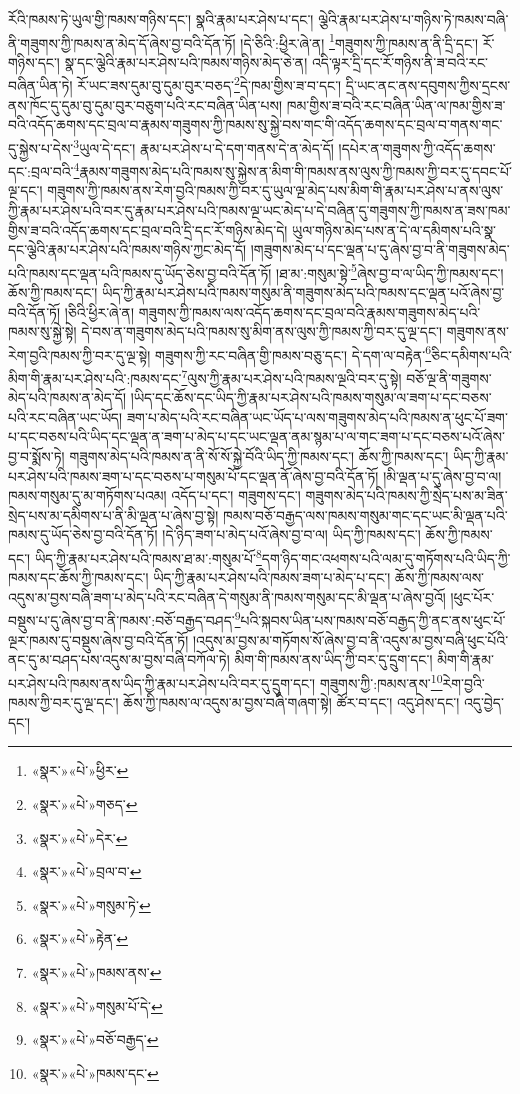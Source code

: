 རོའི་ཁམས་ཏེ་ཡུལ་གྱི་ཁམས་གཉིས་དང་། སྣའི་རྣམ་པར་ཤེས་པ་དང་། ལྕེའི་རྣམ་པར་ཤེས་པ་གཉིས་ཏེ་ཁམས་བཞི་ནི་གཟུགས་ཀྱི་ཁམས་ན་མེད་དོ་ཞེས་བྱ་བའི་དོན་ཏོ། །དེ་ཅིའི་:ཕྱིར་ཞེ་ན། \footnote{«སྣར་»«པེ་»ཕྱིར་}གཟུགས་ཀྱི་ཁམས་ན་ནི་དྲི་དང་། རོ་གཉིས་དང་། སྣ་དང་ལྕེའི་རྣམ་པར་ཤེས་པའི་ཁམས་གཉིས་མེད་ཅེ་ན། འདི་ལྟར་དྲི་དང་རོ་གཉིས་ནི་ཟ་བའི་རང་བཞིན་ཡིན་ཏེ། རོ་ཡང་ཟས་དུམ་བུ་དུམ་བུར་བཅད་\footnote{«སྣར་»«པེ་»གཅད་}དེ་ཁམ་གྱིས་ཟ་བ་དང་། དྲི་ཡང་ནང་ནས་དབུགས་ཀྱིས་དྲངས་ནས་ཁོང་དུ་དུམ་བུ་དུམ་བུར་བཅུག་པའི་རང་བཞིན་ཡིན་པས། ཁམ་གྱིས་ཟ་བའི་རང་བཞིན་ཡིན་ལ་ཁམ་གྱིས་ཟ་བའི་འདོད་ཆགས་དང་བྲལ་བ་རྣམས་གཟུགས་ཀྱི་ཁམས་སུ་སྐྱེ་བས་གང་གི་འདོད་ཆགས་དང་བྲལ་བ་གནས་གང་དུ་སྐྱེས་པ་དེས་\footnote{«སྣར་»«པེ་»དེར་}ཡུལ་དེ་དང་། རྣམ་པར་ཤེས་པ་དེ་དག་གནས་དེ་ན་མེད་དོ། །དཔེར་ན་གཟུགས་ཀྱི་འདོད་ཆགས་དང་:བྲལ་བའི་\footnote{«སྣར་»«པེ་»བྲལ་བ་}རྣམས་གཟུགས་མེད་པའི་ཁམས་སུ་སྐྱེས་ན་མིག་གི་ཁམས་ནས་ལུས་ཀྱི་ཁམས་ཀྱི་བར་དུ་དབང་པོ་ལྔ་དང་། གཟུགས་ཀྱི་ཁམས་ནས་རེག་བྱའི་ཁམས་ཀྱི་བར་དུ་ཡུལ་ལྔ་མེད་པས་མིག་གི་རྣམ་པར་ཤེས་པ་ནས་ལུས་ཀྱི་རྣམ་པར་ཤེས་པའི་བར་དུ་རྣམ་པར་ཤེས་པའི་ཁམས་ལྔ་ཡང་མེད་པ་དེ་བཞིན་དུ་གཟུགས་ཀྱི་ཁམས་ན་ཟས་ཁམ་གྱིས་ཟ་བའི་འདོད་ཆགས་དང་བྲལ་བའི་དྲི་དང་རོ་གཉིས་མེད་དེ། ཡུལ་གཉིས་མེད་པས་ན་དེ་ལ་དམིགས་པའི་སྣ་དང་ལྕེའི་རྣམ་པར་ཤེས་པའི་ཁམས་གཉིས་ཀྱང་མེད་དོ། །གཟུགས་མེད་པ་དང་ལྡན་པ་དུ་ཞེས་བྱ་བ་ནི་གཟུགས་མེད་པའི་ཁམས་དང་ལྡན་པའི་ཁམས་དུ་ཡོད་ཅེས་བྱ་བའི་དོན་ཏོ། །ཐ་མ་:གསུམ་སྟེ་\footnote{«སྣར་»«པེ་»གསུམ་ཏེ་}ཞེས་བྱ་བ་ལ་ཡིད་ཀྱི་ཁམས་དང་། ཆོས་ཀྱི་ཁམས་དང་། ཡིད་ཀྱི་རྣམ་པར་ཤེས་པའི་ཁམས་གསུམ་ནི་གཟུགས་མེད་པའི་ཁམས་དང་ལྡན་པའོ་ཞེས་བྱ་བའི་དོན་ཏོ། །ཅིའི་ཕྱིར་ཞེ་ན། གཟུགས་ཀྱི་ཁམས་ལས་འདོད་ཆགས་དང་བྲལ་བའི་རྣམས་གཟུགས་མེད་པའི་ཁམས་སུ་སྐྱེ་སྟེ། དེ་བས་ན་གཟུགས་མེད་པའི་ཁམས་སུ་མིག་ནས་ལུས་ཀྱི་ཁམས་ཀྱི་བར་དུ་ལྔ་དང་། གཟུགས་ནས་རེག་བྱའི་ཁམས་ཀྱི་བར་དུ་ལྔ་སྟེ། གཟུགས་ཀྱི་རང་བཞིན་གྱི་ཁམས་བཅུ་དང་། དེ་དག་ལ་བརྟེན་\footnote{«སྣར་»«པེ་»རྟེན་}ཅིང་དམིགས་པའི་མིག་གི་རྣམ་པར་ཤེས་པའི་:ཁམས་དང་\footnote{«སྣར་»«པེ་»ཁམས་ནས་}ལུས་ཀྱི་རྣམ་པར་ཤེས་པའི་ཁམས་ལྔའི་བར་དུ་སྟེ། བཅོ་ལྔ་ནི་གཟུགས་མེད་པའི་ཁམས་ན་མེད་དོ། །ཡིད་དང་ཆོས་དང་ཡིད་ཀྱི་རྣམ་པར་ཤེས་པའི་ཁམས་གསུམ་ལ་ཟག་པ་དང་བཅས་པའི་རང་བཞིན་ཡང་ཡོད། ཟག་པ་མེད་པའི་རང་བཞིན་ཡང་ཡོད་པ་ལས་གཟུགས་མེད་པའི་ཁམས་ན་ཕུང་པོ་ཟག་པ་དང་བཅས་པའི་ཡིད་དང་ལྡན་ན་ཟག་པ་མེད་པ་དང་ཡང་ལྡན་ནམ་སྙམ་པ་ལ་གང་ཟག་པ་དང་བཅས་པའོ་ཞེས་བྱ་བ་སྨོས་ཏེ། གཟུགས་མེད་པའི་ཁམས་ན་ནི་སོ་སོ་སྐྱེ་བོའི་ཡིད་ཀྱི་ཁམས་དང་། ཆོས་ཀྱི་ཁམས་དང་། ཡིད་ཀྱི་རྣམ་པར་ཤེས་པའི་ཁམས་ཟག་པ་དང་བཅས་པ་གསུམ་པོ་དང་ལྡན་ནོ་ཞེས་བྱ་བའི་དོན་ཏོ། །མི་ལྡན་པ་དུ་ཞེས་བྱ་བ་ལ། ཁམས་གསུམ་དུ་མ་གཏོགས་པའམ། འདོད་པ་དང་། གཟུགས་དང་། གཟུགས་མེད་པའི་ཁམས་ཀྱི་སྲེད་པས་མ་ཟིན་སྲེད་པས་མ་དམིགས་པ་ནི་མི་ལྡན་པ་ཞེས་བྱ་སྟེ། ཁམས་བཅོ་བརྒྱད་ལས་ཁམས་གསུམ་གང་དང་ཡང་མི་ལྡན་པའི་ཁམས་དུ་ཡོད་ཅེས་བྱ་བའི་དོན་ཏོ། །དེ་ཉིད་ཟག་པ་མེད་པའོ་ཞེས་བྱ་བ་ལ། ཡིད་ཀྱི་ཁམས་དང་། ཆོས་ཀྱི་ཁམས་དང་། ཡིད་ཀྱི་རྣམ་པར་ཤེས་པའི་ཁམས་ཐ་མ་:གསུམ་པོ་\footnote{«སྣར་»«པེ་»གསུམ་པོ་དེ་}དག་ཉིད་གང་འཕགས་པའི་ལམ་དུ་གཏོགས་པའི་ཡིད་ཀྱི་ཁམས་དང་ཆོས་ཀྱི་ཁམས་དང་། ཡིད་ཀྱི་རྣམ་པར་ཤེས་པའི་ཁམས་ཟག་པ་མེད་པ་དང་། ཆོས་ཀྱི་ཁམས་ལས་འདུས་མ་བྱས་བཞི་ཟག་པ་མེད་པའི་རང་བཞིན་དེ་གསུམ་ནི་ཁམས་གསུམ་དང་མི་ལྡན་པ་ཞེས་བྱའོ། །ཕུང་པོར་བསྡུས་པ་དུ་ཞེས་བྱ་བ་ནི་ཁམས་:བཅོ་བརྒྱད་བཤད་\footnote{«སྣར་»«པེ་»བཅོ་བརྒྱད་}པའི་སྐབས་ཡིན་པས་ཁམས་བཅོ་བརྒྱད་ཀྱི་ནང་ནས་ཕུང་པོ་ལྔར་ཁམས་དུ་བསྡུས་ཞེས་བྱ་བའི་དོན་ཏོ། །འདུས་མ་བྱས་མ་གཏོགས་སོ་ཞེས་བྱ་བ་ནི་འདུས་མ་བྱས་བཞི་ཕུང་པོའི་ནང་དུ་མ་བཤད་པས་འདུས་མ་བྱས་བཞི་བཀོལ་ཏེ། མིག་གི་ཁམས་ནས་ཡིད་ཀྱི་བར་དུ་དྲུག་དང་། མིག་གི་རྣམ་པར་ཤེས་པའི་ཁམས་ནས་ཡིད་ཀྱི་རྣམ་པར་ཤེས་པའི་བར་དུ་དྲུག་དང་། གཟུགས་ཀྱི་:ཁམས་ནས་\footnote{«སྣར་»«པེ་»ཁམས་དང་}རེག་བྱའི་ཁམས་ཀྱི་བར་དུ་ལྔ་དང་། ཆོས་ཀྱི་ཁམས་ལ་འདུས་མ་བྱས་བཞི་གཞག་སྟེ། ཚོར་བ་དང་། འདུ་ཤེས་དང་། འདུ་བྱེད་དང་། 